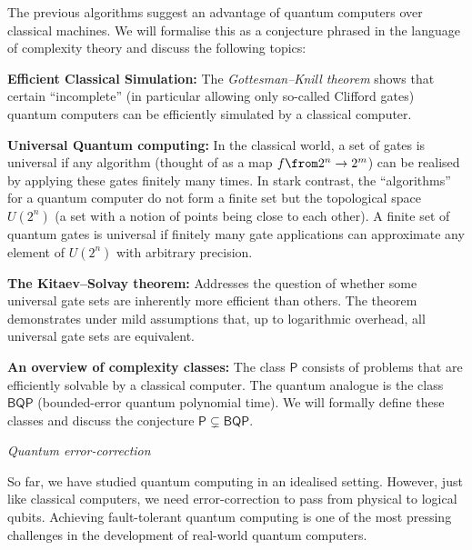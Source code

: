 \documentclass[a4paper,oneside, 12pt]{amsart}
\newcommand*{\Pclass}{\ensuremath{\mathsf{P}}}
\newcommand*{\BQPclass}{\ensuremath{\mathsf{BQP}}}
\begin{document}
The previous algorithms suggest an advantage of quantum computers over classical machines.
We will formalise this as a conjecture phrased in the language of complexity theory and discuss the following topics:
\noindent
\begin{thmlist}
  \item \textbf{Efficient Classical Simulation:}  The \emph{Gottesman--Knill theorem} shows that certain ``incomplete'' (in particular allowing only so-called Clifford gates) quantum computers can be efficiently simulated by a classical computer.
  \item \textbf{Universal Quantum computing:} In the classical world, a set of gates is universal if any algorithm (thought of as a map \(f\from 2^{n}\to 2^{m}\)) can be realised by applying these gates finitely many times.
  In stark contrast, the ``algorithms'' for a quantum computer do not form a finite set but the topological space \(U(2^{n})\) (\ie a set with a notion of points being close to each other).
  A finite set of quantum gates is universal if finitely many gate applications can approximate any element of \(U(2^{n})\) with arbitrary precision.
  \item \textbf{The Kitaev--Solvay theorem:} Addresses the question of whether some universal gate sets are inherently more efficient than others.
  The theorem demonstrates under mild assumptions that, up to logarithmic overhead, all universal gate sets are equivalent.
  \item \textbf{An overview of complexity classes:} The class \(\Pclass\) consists of problems that are efficiently solvable by a classical computer.
  The quantum analogue is the class \(\BQPclass\) (bounded-error quantum polynomial time).
  We will formally define these classes and discuss the conjecture \(\Pclass \subsetneq \BQPclass\).
\end{thmlist}
\bigskip

\begin{center}
  \textit{Quantum error-correction}
\end{center}
\bigskip

So far, we have studied quantum computing in an idealised setting.
However, just like classical computers, we need error-correction to pass from physical to logical qubits.
Achieving fault-tolerant quantum computing is one of the most pressing challenges in the development of real-world quantum computers.
\end{document}
